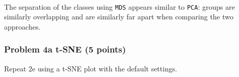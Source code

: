 \documentclass[11pt]{article}
\begin{document}
    \begin{center}
    \end{center}
    { \hspace*{\fill} \\}
    
    The separation of the classes using \texttt{MDS} appears similar to
\texttt{PCA}: groups are similarly overlapping and are similarly far
apart when comparing the two approaches.

    \subsubsection{Problem 4a t-SNE (5
points)}\label{problem-4a-t-sne-5-points}

Repeat 2e using a t-SNE plot with the default settings.
\end{document}
